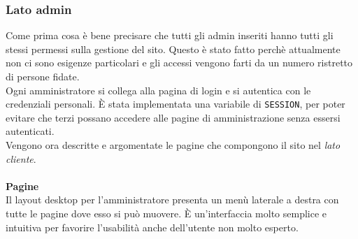 \subsubsection{Lato admin}
Come prima cosa è bene precisare che tutti gli admin inseriti hanno tutti gli stessi permessi sulla gestione del sito. Questo è stato fatto perchè attualmente non ci sono esigenze particolari e gli accessi vengono farti da un numero ristretto di persone fidate.\\
Ogni amministratore si collega alla pagina di login e si autentica con le credenziali personali. È stata implementata una variabile di \texttt{SESSION}, per poter evitare che terzi possano accedere alle pagine di amministrazione senza essersi autenticati.\\
Vengono ora descritte e argomentate le pagine che compongono il sito nel \textit{lato cliente}.\\\\
\textbf{Pagine}\\ Il layout desktop per l'amministratore presenta un menù laterale a destra con tutte le pagine dove esso si può muovere. È un'interfaccia molto semplice e intuitiva per favorire l'usabilità anche dell'utente non molto esperto.
